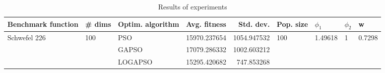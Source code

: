 \begin{table}
\centering
\caption{Results of experiments}
\begin{tabular}{lllrrllll}
\toprule
           Benchmark function &              \# dims & Optim. algorithm &  Avg. fitness &   Std. dev. &            Pop. size &               $\phi_{1}$ &         $\phi_{2}$ &                       w \\
\midrule
\multirow{3}{*}{Schwefel 226} & \multirow{3}{*}{100} &              PSO &  15970.237654 & 1054.947532 & \multirow{3}{*}{100} & \multirow{3}{*}{1.49618} & \multirow{3}{*}{1} & \multirow{3}{*}{0.7298} \\
                              &                      &            GAPSO &  17079.286332 & 1002.603212 &                      &                          &                    &                         \\
                              &                      &          LOGAPSO &  15295.420682 &  747.853268 &                      &                          &                    &                         \\
\bottomrule
\end{tabular}
\end{table}
